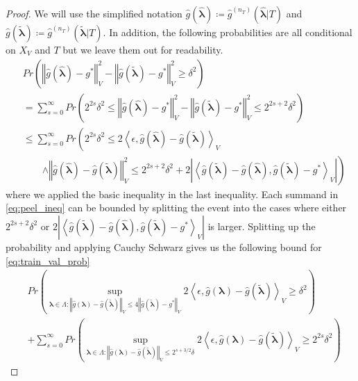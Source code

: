 \documentclass[12pt]{article}
\begin{document}
\begin{proof}
	We will use the simplified notation $\hat{g}(\hat{\boldsymbol{\lambda}}) \coloneqq \hat{g}^{(n_T)}(\hat{\boldsymbol{\lambda}} | T)$ and $\hat{g}(\tilde{\boldsymbol{\lambda}}) \coloneqq \hat{g}^{(n_T)}(\tilde{\boldsymbol{\lambda}} | T)$. In addition, the following probabilities are all conditional on $X_V$ and $T$ but we leave them out for readability.
	\begin{align}
	&  Pr\left(\left\Vert \hat{g}(\hat{\boldsymbol{\lambda}})-g^{*}\right\Vert _{V}^{2}-\left\Vert \hat{g}(\tilde{\boldsymbol{\lambda}})-g^{*}\right\Vert _{V}^{2}\ge\delta^{2}\right) \label{eq:train_val_prob}\\
	& = \sum_{s=0}^{\infty}Pr\left(2^{2s}\delta^{2}\le\left\Vert \hat{g}(\hat{\boldsymbol{\lambda}})-g^{*}\right\Vert _{V}^{2}-\left\Vert \hat{g}(\tilde{\boldsymbol{\lambda}})-g^{*}\right\Vert _{V}^{2}\le2^{2s+2}\delta^{2}\right) 
	\label{eq:peeled} \\
	&\le \sum_{s=0}^{\infty} Pr\left(2^{2s}\delta^{2}\le2\left\langle \epsilon,\hat{g}(\hat{\boldsymbol{\lambda}})-\hat{g}(\tilde{\boldsymbol{\lambda}})\right\rangle _{V}\right. \label{eq:peel_ineq}\\
	& \qquad  \left.\wedge \left\Vert \hat{g}(\hat{\boldsymbol{\lambda}})-\hat{g}(\tilde{\boldsymbol{\lambda}})\right\Vert_{V}^{2}\le2^{2s+2}\delta^{2}+ 2\left|\left\langle \hat{g}(\tilde{\boldsymbol{\lambda}})-\hat{g}(\hat{\boldsymbol{\lambda}}),\hat{g}(\tilde{\boldsymbol{\lambda}})-g^{*}\right\rangle _{V}\right| \right )	
	\end{align}
	where we applied the basic inequality in the last inequality.
	Each summand in \eqref{eq:peel_ineq} can be bounded by splitting the event into the cases where either $2^{2s+2} \delta^2$ or $2\left|\left\langle \hat{g}(\tilde{\boldsymbol{\lambda}})-\hat{g}(\hat{\boldsymbol{\lambda}}),\hat{g}(\tilde{\boldsymbol{\lambda}})-g^{*}\right\rangle _{V}\right|$ is larger. Splitting up the probability and applying Cauchy Schwarz gives us the following bound for \eqref{eq:train_val_prob}
	\begin{align}
	& Pr\left(
	\sup_{\boldsymbol{\lambda} \in \Lambda: \left\Vert \hat{g}({\boldsymbol{\lambda}})-\hat{g}(\tilde{\boldsymbol{\lambda}})\right\Vert _{V}
		\le
		4\left\Vert \hat{g}(\tilde{\boldsymbol{\lambda}})-g^{*}\right\Vert _{V}}
	2\left\langle \epsilon,\hat{g}({\boldsymbol{\lambda}})-\hat{g}(\tilde{\boldsymbol{\lambda}})\right\rangle _{V}
	\ge 
	\delta^{2}
	\right)
	\label{eq:train_val_1}
	\\
	& + \sum_{s=0}^{\infty} Pr\left(
	\sup_{\boldsymbol{\lambda} \in \Lambda: \left\Vert \hat{g}({\boldsymbol{\lambda}})-\hat{g}(\tilde{\boldsymbol{\lambda}})\right\Vert _{V}
		\le
		2^{s+3/2}\delta}
	2\left\langle \epsilon,\hat{g}({\boldsymbol{\lambda}})-\hat{g}(\tilde{\boldsymbol{\lambda}})\right\rangle _{V}
	\ge
	2^{2s} \delta^{2}
	\right)
	\label{eq:train_val_2}
	\end{align}
	

\end{proof}
\end{document}
